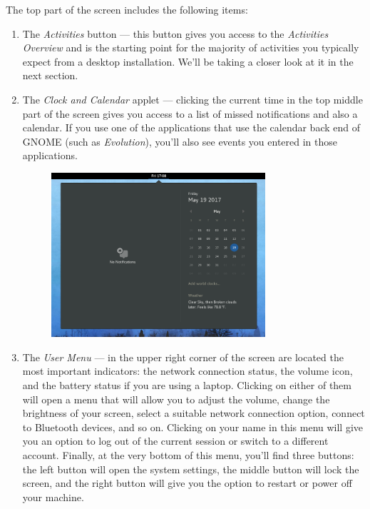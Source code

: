 \newpage
The top part of the screen includes the following items:
\begin{enumerate}
\item The \emph{Activities} button --- this button gives you access to the \emph{Activities Overview} and is the starting point for the majority of activities you typically expect from a desktop installation. We'll be taking a closer look at it in the next section.

\item The \emph{Clock and Calendar} applet --- clicking the current time in the top middle part of the screen gives you access to a list of missed notifications and also a calendar. If you use one of the applications that use the calendar back end of GNOME (such as \emph{Evolution}), you'll also see events you entered in those applications.

\begin{figure}[tbp]
\begin{center}
\includegraphics[width=0.75\textwidth]{img/calendar}
 \label{fig:calendar}
\end{center}
\end{figure}

\item The \emph{User Menu} --- in the upper right corner of the screen are located the most important indicators: the network connection status, the volume icon, and the battery status if you are using a laptop. Clicking on either of them will open a menu that will allow you to adjust the volume, change the brightness of your screen, select a suitable network connection option, connect to Bluetooth devices, and so on. Clicking on your name in this menu will give you an option to log out of the current session or switch to a different account. Finally, at the very bottom of this menu, you'll find three buttons: the left button will open the system settings, the middle button will lock the screen, and the right button will give you the option to restart or power off your machine.


\end{enumerate}
